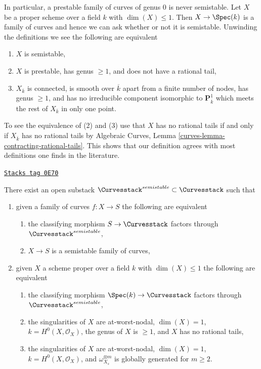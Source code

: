 In particular, a prestable family of curves of genus $0$ is never
semistable.
Let $X$ be a proper scheme over a field $k$ with $\dim(X) \leq 1$.
Then $X \to \Spec(k)$ is a family of curves and hence we can ask
whether or not it is semistable. Unwinding the definitions we see
the following are equivalent
\begin{enumerate}
\item $X$ is semistable,
\item $X$ is prestable, has genus $\geq 1$, and does not have a rational tail,
\item $X_{\overline{k}}$ is connected, is smooth over $\overline{k}$
apart from a finite number of nodes, has genus $\geq 1$, and has no
irreducible component isomorphic to $\mathbf{P}^1_{\overline{k}}$
which meets the rest of $X_{\overline{k}}$ in only one point.
\end{enumerate}
To see the equivalence of (2) and (3) use that $X$ has no rational tails
if and only if $X_{\overline{k}}$ has no rational tails by
Algebraic Curves, Lemma \ref{curves-lemma-contracting-rational-tails}.
This shows that our definition agrees with most definitions one finds
in the literature.

\begin{lemma}
\label{moduli-curves-lemma-semistable-curves}
\href{https://stacks.math.columbia.edu/tag/0E70}{\texttt{Stacks tag 0E70}}

There exist an open substack $\Curvesstack^{semistable} \subset \Curvesstack$
such that
\begin{enumerate}
\item given a family of curves $f : X \to S$ the following are equivalent
\begin{enumerate}
\item the classifying morphism $S \to \Curvesstack$ factors
through $\Curvesstack^{semistable}$,
\item $X \to S$ is a semistable family of curves,
\end{enumerate}
\item given $X$ a scheme proper over a field $k$ with
$\dim(X) \leq 1$ the following are equivalent
\begin{enumerate}
\item the classifying morphism $\Spec(k) \to \Curvesstack$
factors through $\Curvesstack^{semistable}$,
\item the singularities of $X$ are at-worst-nodal, $\dim(X) = 1$,
$k = H^0(X, \mathcal{O}_X)$, the genus of $X$ is $\geq 1$, and
$X$ has no rational tails,
\item the singularities of $X$ are at-worst-nodal, $\dim(X) = 1$,
$k = H^0(X, \mathcal{O}_X)$, and $\omega_{X_s}^{\otimes m}$ is
globally generated for $m \geq 2$.
\end{enumerate}
\end{enumerate}
\end{lemma}

